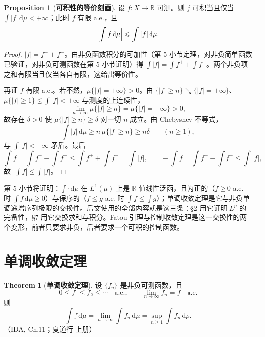 \documentclass[oneside]{book}
\theoremstyle{definition}
\newcommand{\R}{\mathbb{R}}
\newcommand{\dd}{\mathrm{d}}
\theoremstyle{definition}
\newtheorem{proposition}{Proposition}[section]
\newtheorem{theorem}{Theorem}[section]
\begin{document}
	\begin{proposition}[\bfseries{可积性的等价刻画}]
		设 $f:X\to\overline{\R}$ 可测。则 $f$ 可积当且仅当 $\int|f|\,\dd\mu<+\infty$；此时 $f$ 有限 a.e.，且
		\[
		\Bigl|\int f\,\dd\mu\Bigr|\leqslant\int|f|\,\dd\mu .
		\]
	\end{proposition}
	
	\begin{proof}
		$|f|=f^{+}+f^{-}$。由非负函数积分的可加性（第 5 小节定理，对非负简单函数已验证，对非负可测函数在第 5 小节证明）得 $\int|f|=\int f^{+}+\int f^{-}$。两个非负项之和有限当且仅当各自有限，这给出等价性。
		
		再证 $f$ 有限 a.e.。若不然，$\mu\{|f|=+\infty\}>0$。由 $\{|f|\geqslant n\}\searrow\{|f|=+\infty\}$、$\mu\{|f|\geqslant1\}\leqslant\int|f|<+\infty$ 与测度的上连续性，
		\[
		\lim_{n\to\infty}\mu\{|f|\geqslant n\}=\mu\{|f|=+\infty\}>0,
		\]
		故存在 $\delta>0$ 使 $\mu\{|f|\geqslant n\}\geqslant\delta$ 对一切 $n$ 成立。由 Chebyshev 不等式，
		\[
		\int|f|\,\dd\mu\geqslant n\,\mu\{|f|\geqslant n\}\geqslant n\delta\qquad(n\geqslant1),
		\]
		与 $\int|f|<+\infty$ 矛盾。最后
		\[
		\int f=\int f^{+}-\int f^{-}\leqslant\int f^{+}+\int f^{-}=\int|f|,\qquad -\int f=\int f^{-}-\int f^{+}\leqslant\int|f|,
		\]
		故 $|\int f|\leqslant\int|f|$。
	\end{proof}
	
	\begin{note}
		第 5 小节将证明：$\int\cdot\,\dd\mu$ 在 $L^{1}(\mu)$ 上是 $\R$ 值线性泛函，且为正的（$f\geqslant0$ a.e. 时 $\int f\,\dd\mu\geqslant0$）与保序的（$f\leqslant g$ a.e. 时 $\int f\leqslant\int g$）；单调收敛定理是它与非负单调递增序列极限的交换性。后文使用的全部内容就是这三条：\S2 用它证明 $L^{p}$ 的完备性，\S7 用它交换求和与积分。Fatou 引理与控制收敛定理是这一交换性的两个变形，前者只要求非负，后者要求一个可积的控制函数。
	\end{note}
	
	\section{单调收敛定理}
	
	\begin{theorem}[\bfseries{单调收敛定理}]
		设 $\{f_n\}$ 是非负可测函数，且
		\[
		0\leqslant f_1\leqslant f_2\leqslant\cdots\quad\text{a.e.},\qquad \lim_{n\to\infty}f_n=f\quad\text{a.e.}
		\]
		则
		\[
		\int f\,\dd\mu=\lim_{n\to\infty}\int f_n\,\dd\mu=\sup_{n\geqslant1}\int f_n\,\dd\mu .
		\]
		（IDA, Ch.11；夏道行 上册）
	\end{theorem}
	
\end{document}
